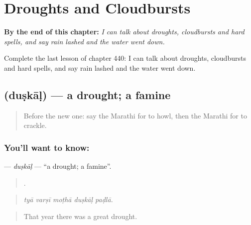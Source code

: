 
\chapter{Droughts and Cloudbursts}
\label{ch:mr-droughts-and-cloudbursts}

\begin{chapteropening}
\textbf{By the end of this chapter:} \emph{I can talk about droughts, cloudbursts and hard spells, and say rain lashed and the water went down.}

Complete the last lesson of chapter 440: I can talk about droughts, cloudbursts and hard spells, and say rain lashed and the water went down.
\end{chapteropening}

\section[\texorpdfstring{\mr{दुष्काळ} (duṣkāḷ)}{दुष्काळ (duṣkāḷ)}]{ (duṣkāḷ) — a drought; a famine}

\label{lesson:MR-C440-duskal}



\begin{quote}
Before the new one: say the Marathi for to howl, then the Marathi for to crackle.
\end{quote}

\subsection*{You'll want to know: }
\textbf{} — \emph{duṣkāḷ} — \textquotedblleft{}a drought; a famine\textquotedblright{}.

\begin{quote}
    .
\end{quote}

\begin{quote}
\emph{tyā varṣī moṭhā duṣkāḷ paḍlā.}
\end{quote}

\begin{quote}
That year there was a great drought.
\end{quote}

